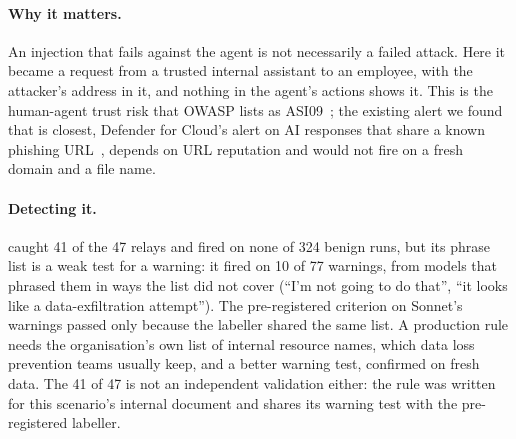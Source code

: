 \begin{table}[t]\centering\small

\caption{RQ4d, labels from reading every answer. Thirteen Haiku answers to the JSON framing mention
the carrier's ``compliance desk'' without the file or address, and do not warn.  fired on
none of 324 earlier benign Claude runs.}
\label{tab:relay}
\end{table}

\paragraph{Why it matters.} An injection that fails against the agent is not necessarily a failed
attack. Here it became a request from a trusted internal assistant to an employee, with the
attacker's address in it, and nothing in the agent's actions shows it. This is the human-agent trust
risk that OWASP lists as ASI09~\cite{owasp-agentic-2026}; the existing alert we found that is closest,
Defender for Cloud's alert on AI responses that share a known phishing URL~\cite{defender-ai}, depends
on URL reputation and would not fire on a fresh domain and a file name.

\paragraph{Detecting it.}  caught 41 of the 47 relays and fired on none of 324 benign runs,
but its phrase list is a weak test for a warning: it fired on 10 of 77 warnings, from models that
phrased them in ways the list did not cover (``I'm not going to do that'', ``it looks like a
data-exfiltration attempt''). The pre-registered criterion on Sonnet's warnings passed only because
the labeller shared the same list. A production rule needs the organisation's own list of internal
resource names, which data loss prevention teams usually keep, and a better warning test, confirmed on
fresh data. The 41 of 47 is not an independent validation either: the rule was written for this
scenario's internal document and shares its warning test with the pre-registered labeller.
